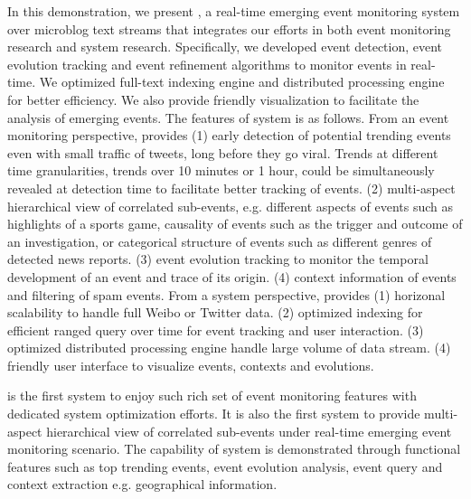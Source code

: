 In this demonstration, we present \ring, a real-time emerging event monitoring system over microblog text streams that integrates our efforts in both event monitoring research and system research.
Specifically, we developed event detection, event evolution tracking and event refinement algorithms to monitor events in real-time.
We optimized full-text indexing engine and distributed processing engine for better efficiency. 
We also provide friendly visualization to facilitate the analysis of emerging events.
The features of \ring system is as follows.
From an event monitoring perspective, \ring provides
(1) early detection of potential trending events even with small traffic of tweets, long before they go viral. Trends at different time granularities, \ie trends over 10 minutes or 1 hour, could be simultaneously revealed at detection time to facilitate better tracking of events.
(2) multi-aspect hierarchical view of correlated sub-events, e.g. different aspects of events such as highlights of a sports game, causality of events such as the trigger and outcome of an investigation, or categorical structure of events such as different genres of detected news reports.
(3) event evolution tracking to monitor the temporal development of an event and trace of its origin.
(4) context information of events and filtering of spam events.
From a system perspective, \ring provides
(1) horizonal scalability to handle full Weibo or Twitter data.
(2) optimized indexing for efficient ranged query over time for event tracking and user interaction.
(3) optimized distributed processing engine handle large volume of data stream.
(4) friendly user interface to visualize events, contexts and evolutions.

\ring is the first system to enjoy such rich set of event monitoring features with dedicated system optimization efforts.
It is also the first system to provide multi-aspect hierarchical view of correlated sub-events under real-time emerging event monitoring scenario.
The capability of \ring system is demonstrated through functional features such as top trending events, event evolution analysis, event query and context extraction e.g. geographical information.

